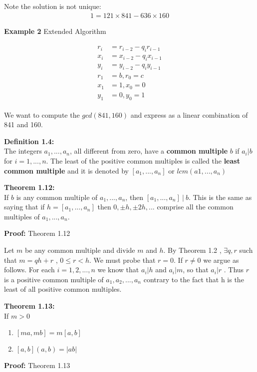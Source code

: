 \documentclass[a4paper]{article}
\begin{document}
Note the solution is not unique:
\begin{align}
1=121\times841 - 636\times 160
\end{align}

\textbf{Example 2} Extended Algorithm


\begin{align}
\begin{split}
r_i&=r_{i-2} - q_ir_{i-1} \\
x_i&=x_{i-2} - q_ix_{i-1} \\
y_i&=y_{i-2} - q_iy_{i-1} \\
r_1&=b , r_0=c \\
x_1&=1 , x_0=0 \\
y_1&=0 , y_0=1
\end{split}
\end{align}

We want to compute the $gcd(841,160)$ and express as a linear combination of 841 and 160.

\textbf{Definition 1.4:}\\
The integers $a_1,...,a_n$, all different from zero, have a \textbf{common multiple} $b$ if $a_i|b$ for $i=1,...,n$. The least of the positive common multiples is called the \textbf{least common multiple} and it is denoted by $[a_1,...,a_n]$ or $lcm(a1,...,a_n)$

\textbf{Theorem 1.12:}\\
If $b$ is any common multiple of $a_1,...,a_n$, then $[a_1,...,a_n]\ |\ b$. This is the same as saying that if $h=[a_1,...,a_n]$ then $0,\pm h,\pm 2h,...$ comprise all the common multiples of $a_1,...,a_n$.

\textbf{Proof:} Theorem 1.12

Let $m$ be any common multiple and divide $m$ and $h$. By Theorem 1.2 , $\exists q,r$ such that $m=qh+r$ , $ 0\leq r<h.$ We must probe that $r=0$. If $r\neq0$ we argue as follows. For each $i=1,2,...,n$ we know that $a_i|h$ and $a_i|m$, so that $a_i|r$ . Thus $r$ is a positive common multiple of $a_1,a_2,...,a_n$ contrary to the fact that h is the least of all positive common multiples.


\textbf{Theorem 1.13:}\\
If $m>0$
\begin{enumerate}
    \item $[ma,mb] = m[a,b]$
    \item $[a,b](a,b)=|ab|$
\end{enumerate}

\textbf{Proof:} Theorem 1.13
\end{document}
